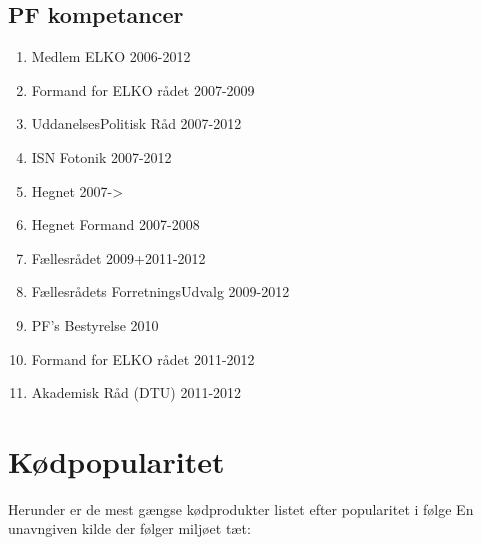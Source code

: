 \subsection{PF kompetancer}
\begin{enumerate}
\item Medlem ELKO 2006-2012
\item Formand for ELKO rådet 2007-2009
\item UddanelsesPolitisk Råd 2007-2012
\item ISN Fotonik 2007-2012
\item Hegnet 2007->
\item Hegnet Formand 2007-2008
\item Fællesrådet 2009+2011-2012
\item Fællesrådets ForretningsUdvalg 2009-2012
\item PF's Bestyrelse 2010
\item Formand for ELKO rådet 2011-2012
\item Akademisk Råd (DTU) 2011-2012
\end{enumerate}

\section{Kødpopularitet}


Herunder er de mest gængse kødprodukter listet efter popularitet i følge En unavngiven kilde der følger miljøet tæt:


